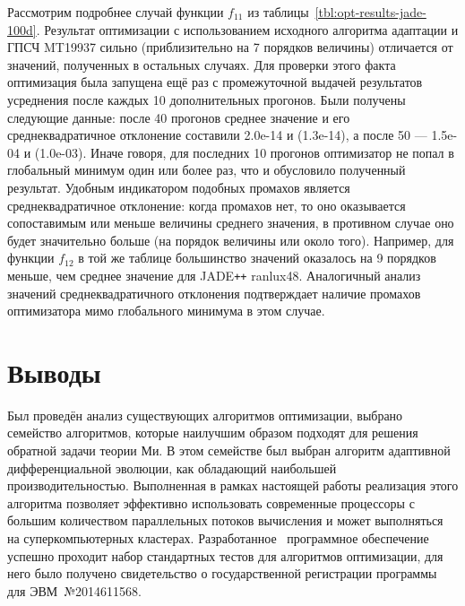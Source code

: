 Рассмотрим подробнее случай функции $f_{11}$ из
таблицы~\ref{tbl:opt-results-jade-100d}.  Результат оптимизации с использованием исходного алгоритма адаптации и ГПСЧ MT19937 сильно (приблизительно на 7 порядков величины) отличается от
значений, полученных в остальных случаях.  Для проверки этого факта
оптимизация была запущена ещё раз с промежуточной выдачей результатов
усреднения после каждых 10 дополнительных прогонов.  Были получены
следующие данные: после 40 прогонов среднее значение и его
среднеквадратичное отклонение составили 2.0e-14 и (1.3e-14), а после
50 --- 1.5e-04 и (1.0e-03).  Иначе говоря, для последних 10 прогонов
оптимизатор не попал в глобальный минимум один или более раз, что и
обусловило полученный результат.  Удобным индикатором подобных
промахов является среднеквадратичное отклонение: когда промахов
нет, то оно оказывается сопоставимым или меньше величины среднего значения,
в противном случае оно будет значительно больше (на порядок величины или около того).
 Например, для функции $f_{12}$ в той же таблице большинство
значений оказалось на 9 порядков меньше, чем среднее значение для
JADE\texttt{++} ranlux48. Аналогичный анализ значений среднеквадратичного
отклонения подтверждает наличие промахов оптимизатора мимо глобального
минимума в этом случае.

\section{Выводы}
 
Был проведён анализ существующих алгоритмов оптимизации, выбрано
семейство алгоритмов, которые наилучшим образом подходят для решения
обратной задачи теории Ми. В этом семействе был выбран алгоритм
адаптивной дифференциальной эволюции, как обладающий наибольшей
производительностью.  Выполненная в рамках настоящей работы реализация
этого алгоритма позволяет эффективно использовать современные
процессоры с большим количеством параллельных потоков вычисления и
может выполняться на суперкомпьютерных кластерах.
Разработанное~\cite{JADE-web} программное обеспечение успешно проходит
набор стандартных тестов для алгоритмов оптимизации, для него было получено
свидетельство о государственной регистрации программы для
ЭВМ~№2014611568.
\clearpage